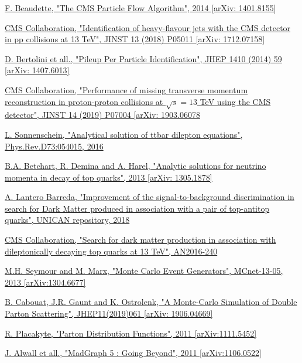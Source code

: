 \documentclass[a4paper, 10pt, openright]{report}
\begin{document}
\begin{thebibliography}{1}
\href{https://arxiv.org/abs/1401.8155}{F. Beaudette,
"The CMS Particle Flow Algorithm",
2014 [arXiv: 1401.8155]}

\href{https://arxiv.org/abs/1712.07158}{CMS Collaboration,
"Identification of heavy-flavour jets with the CMS detector in pp collisions at 13 TeV",
JINST 13 (2018) P05011 [arXiv: 1712.07158]}

\href{https://arxiv.org/pdf/1407.6013.pdf}{D. Bertolini et all.,
"Pileup Per Particle Identification", 
JHEP 1410 (2014) 59 [arXiv: 1407.6013]}

\href{https://arxiv.org/abs/1903.06078}{CMS Collaboration,
"Performance of missing transverse momentum reconstruction in proton-proton collisions at $\sqrt{s} = 13$ TeV using the CMS detector",
JINST 14 (2019) P07004 [arXiv: 1903.06078}

\href{https://arxiv.org/abs/hep-ph/0603011}{L. Sonnenschein,
"Analytical solution of ttbar dilepton equations",
Phys.Rev.D73:054015, 2016}

\href{https://arxiv.org/pdf/1305.1878.pdf}{B.A. Betchart, R. Demina and A. Harel,
"Analytic solutions for neutrino momenta in decay of top quarks",
2013 [arXiv: 1305.1878]}

\href{https://repositorio.unican.es/xmlui/bitstream/handle/10902/15648/Lantero\%20Barreda\%20Agustin.pdf}{A. Lantero Barreda,
"Improvement of the signal-to-background discrimination in search for Dark Matter produced in association with a pair of top-antitop quarks",
UNICAN repository, 2018}

\href{http://cms.cern.ch/iCMS/user/noteinfo?cmsnoteid=CMS\%20AN-2016/240}{CMS Collaboration,
"Search for dark matter production in association with dileptonically decaying top quarks at 13 TeV", AN2016-240}

\href{https://arxiv.org/abs/1304.6677}{M.H. Seymour and M. Marx,
"Monte Carlo Event Generators",
MCnet-13-05, 2013 [arXiv:1304.6677]}

\href{https://arxiv.org/abs/1906.04669}{B. Cabouat, J.R. Gaunt and K. Ostrolenk,
"A Monte-Carlo Simulation of Double Parton Scattering",
JHEP11(2019)061 [arXiv: 1906.04669]}

\href{https://arxiv.org/abs/1111.5452}{R. Placakyte,
"Parton Distribution Functions",
2011 [arXiv:1111.5452]}

\href{https://arxiv.org/abs/1106.0522}{J. Alwall et all.,
"MadGraph 5 : Going Beyond",
2011 [arXiv:1106.0522]}


\end{thebibliography}
\end{document}
